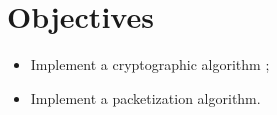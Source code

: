 \section*{Objectives}

\begin{itemize}
    \item Implement a cryptographic algorithm ;
    \item Implement a packetization algorithm.
\end{itemize}
